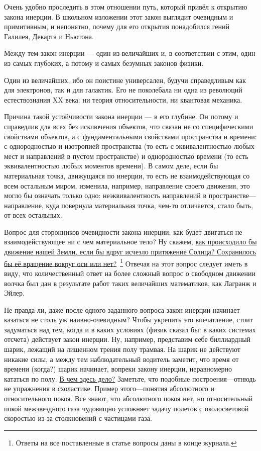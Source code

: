 \documentclass[twocolumn,10pt]{article}
\begin{document}
Очень удобно проследить в этом отношении путь, который привёл к открытию закона инерции. В школьном изложении этот закон выглядит очевидным и примитивным, и непонятно, почему для его открытия понадобился гений Галилея, Декарта и Ньютона.

Между тем закон инерции --- один из величайших и, в соответствии с этим, один из самых глубоких, а потому и самых безумных законов физики.

Один из величайших, ибо он поистине универсален, будучи справедливым как для электронов, так и для галактик. Его не поколебала ни одна из революций естествознания XX века: ни теория относительности, ни квантовая механика.

Причина такой устойчивости закона инерции --- в его глубине. Он потому и справедлив для всех без исключения объектов, что связан не со специфическими свойствами объектов, а с фундаментальными свойствами пространства и времени: с однородностью и изотропией пространства (то есть с эквивалентностью любых мест и направлений в пустом пространстве) и однородностью времени (то есть эквивалентностью любых моментов времени). В самом деле, если бы материальная точка, движущаяся по инерции, то есть не взаимодействующая со всем остальным миром, изменила, например, направление своего движения, это могло бы означать только одно: неэквивалентность направлений в пространстве--- направление, куда повернула материальная точка, чем-то отличается, стало быть, от всех остальных.

Вопрос для сторонников очевидности закона инерции: как будет двигаться не взаимодействующее ни с чем материальное тело? Ну скажем, \uline{как происходило бы движение нашей Земли, если бы вдруг исчезло притяжение Солнца? Сохранилось бы её вращение вокруг оси или нет?}~\footnote{Ответы на все поставленные в статье вопросы даны в конце журнала.} Отвечая на этот вопрос следует иметь в виду, что количественный ответ на более сложный вопрос о свободном движении волчка был дан в результате работ таких величайших математиков, как Лагранж и Эйлер.

Не правда ли, даже после одного заданного вопроса закон инерции начинает казаться не столь уж наивно-очевидным? Чтобы укрепить это впечатление, стоит задуматься над тем, когда и в каких условиях (физик сказал бы: в каких системах отсчета) действует закон инерции. Ну, например, представим себе биллиардный шарик, лежащий на лишенном трения полу трамвая. На шарик не действуют никакие силы, а между тем наблюдательный водитель заметит, что время от времени (когда?) шарик начинает, вопреки закону инерции, неравномерно кататься по полу. \uline{В чем здесь дело?} Заметьте, что подобные построения---отнюдь не упражнения в схоластике. Пример этого---понятия абсолютного и относительного покоя. Все знают, что абсолютного покоя нет, но относительный покой межзвездного газа чудовищно усложняет задачу полетов с околосветовой скоростью из-за столкновений с частицами газа.
\end{document}
